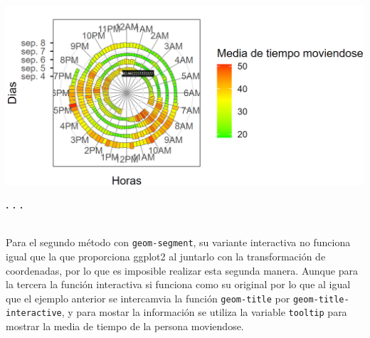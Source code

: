 \documentclass{article}\usepackage[]{graphicx}\usepackage[]{color}
\begin{document}
\vbox{
    \centering
    \includegraphics[width=1\textwidth]{imag/espiral_inte_1}
}
\begin{center}
\textbf{. . .}
\end{center}
~\\
Para el segundo m\'etodo con \texttt{geom-segment}, su variante interactiva no funciona igual que la que proporciona ggplot2 al juntarlo con la transformaci\'on de coordenadas, por lo que es imposible realizar esta segunda manera. Aunque para la tercera la funci\'on interactiva si funciona como su original por lo que al igual que el ejemplo anterior se intercamvia la funci\'on \texttt{geom-title} por \texttt{geom-title-interactive}, y para mostar la informaci\'on se utiliza la variable \texttt{tooltip} para mostrar la media de tiempo de la persona moviendose.
\clearpage
\end{document}
